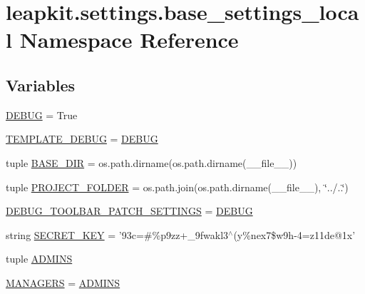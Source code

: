 \hypertarget{namespaceleapkit_1_1settings_1_1base__settings__local}{\section{leapkit.\-settings.\-base\-\_\-settings\-\_\-local Namespace Reference}
\label{namespaceleapkit_1_1settings_1_1base__settings__local}
}
\subsection*{Variables}
\begin{DoxyCompactItemize}
\item 
\hyperlink{namespaceleapkit_1_1settings_1_1base__settings__local_a79987151617169add888bd56fab21596}{D\-E\-B\-U\-G} = True
\item 
\hyperlink{namespaceleapkit_1_1settings_1_1base__settings__local_aa6906a9bb9c301c2a6719df8338d10a4}{T\-E\-M\-P\-L\-A\-T\-E\-\_\-\-D\-E\-B\-U\-G} = \hyperlink{namespaceleapkit_1_1settings_1_1base__settings__local_a79987151617169add888bd56fab21596}{D\-E\-B\-U\-G}
\item 
tuple \hyperlink{namespaceleapkit_1_1settings_1_1base__settings__local_a4b3725bd1d9a8b11591f135a9cac94d1}{B\-A\-S\-E\-\_\-\-D\-I\-R} = os.\-path.\-dirname(os.\-path.\-dirname(\-\_\-\-\_\-file\-\_\-\-\_\-))
\item 
tuple \hyperlink{namespaceleapkit_1_1settings_1_1base__settings__local_a7683d01d853ba8d1db18d71d0ef9760f}{P\-R\-O\-J\-E\-C\-T\-\_\-\-F\-O\-L\-D\-E\-R} = os.\-path.\-join(os.\-path.\-dirname(\-\_\-\-\_\-file\-\_\-\-\_\-), \char`\"{}../..\char`\"{})
\item 
\hyperlink{namespaceleapkit_1_1settings_1_1base__settings__local_a1d3ba5f658178595aec8500bbe8a08fb}{D\-E\-B\-U\-G\-\_\-\-T\-O\-O\-L\-B\-A\-R\-\_\-\-P\-A\-T\-C\-H\-\_\-\-S\-E\-T\-T\-I\-N\-G\-S} = \hyperlink{namespaceleapkit_1_1settings_1_1base__settings__local_a79987151617169add888bd56fab21596}{D\-E\-B\-U\-G}
\item 
string \hyperlink{namespaceleapkit_1_1settings_1_1base__settings__local_a6ac51db0511f14f9fbb533c012e3178a}{S\-E\-C\-R\-E\-T\-\_\-\-K\-E\-Y} = '93c=\#\%p9zz+\-\_\-9fwakl3$^\wedge$(y\%nex7\$w9h-\/4=z11de@1x'
\item 
tuple \hyperlink{namespaceleapkit_1_1settings_1_1base__settings__local_ab9f8210c55142b46baf2374af4447421}{A\-D\-M\-I\-N\-S}
\item 
\hyperlink{namespaceleapkit_1_1settings_1_1base__settings__local_a8398406d3706ede4d448c8a017bfa6b5}{M\-A\-N\-A\-G\-E\-R\-S} = \hyperlink{namespaceleapkit_1_1settings_1_1base__settings__local_ab9f8210c55142b46baf2374af4447421}{A\-D\-M\-I\-N\-S}

\end{DoxyCompactItemize}
